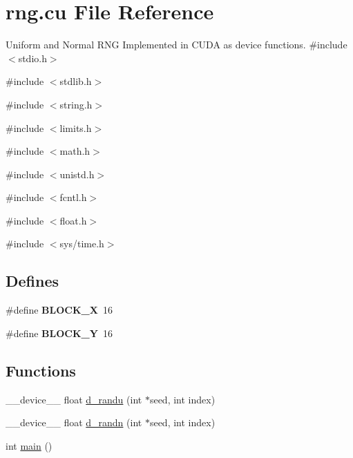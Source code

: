 \hypertarget{rng_8cu}{
\section{rng.cu File Reference}
\label{rng_8cu}
}


Uniform and Normal RNG Implemented in CUDA as device functions.  
{\ttfamily \#include $<$stdio.h$>$}\par
{\ttfamily \#include $<$stdlib.h$>$}\par
{\ttfamily \#include $<$string.h$>$}\par
{\ttfamily \#include $<$limits.h$>$}\par
{\ttfamily \#include $<$math.h$>$}\par
{\ttfamily \#include $<$unistd.h$>$}\par
{\ttfamily \#include $<$fcntl.h$>$}\par
{\ttfamily \#include $<$float.h$>$}\par
{\ttfamily \#include $<$sys/time.h$>$}\par
\subsection*{Defines}
\begin{DoxyCompactItemize}
\item 
\hypertarget{rng_8cu_a165bd291e719c4542ebcb897b0fa5481}{
\#define {\bfseries BLOCK\_\-X}~16}
\label{rng_8cu_a165bd291e719c4542ebcb897b0fa5481}

\item 
\hypertarget{rng_8cu_a9e261e89727a3aafdc4d8732f5b3389f}{
\#define {\bfseries BLOCK\_\-Y}~16}
\label{rng_8cu_a9e261e89727a3aafdc4d8732f5b3389f}

\end{DoxyCompactItemize}
\subsection*{Functions}
\begin{DoxyCompactItemize}
\item 
\_\-\_\-device\_\-\_\- float \hyperlink{rng_8cu_add17ca83d016a5c14fed14c87734ac8c}{d\_\-randu} (int $\ast$seed, int index)
\item 
\_\-\_\-device\_\-\_\- float \hyperlink{rng_8cu_ae73ea1d15de0775879be9d0457189f32}{d\_\-randn} (int $\ast$seed, int index)
\item 
int \hyperlink{rng_8cu_ae66f6b31b5ad750f1fe042a706a4e3d4}{main} ()
\end{DoxyCompactItemize}


